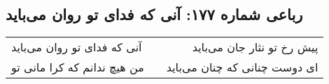 \begin{center}
\section*{رباعی شماره ۱۷۷: آنی که فدای تو روان می‌باید}
\label{sec:sh177}
\begin{longtable}{l p{0.5cm} r}
آنی که فدای تو روان می‌باید
&&
پیش رخ تو نثار جان می‌باید
\\
من هیچ ندانم که کرا مانی تو
&&
ای دوست چنانی که چنان می‌باید
\\
\end{longtable}
\end{center}
